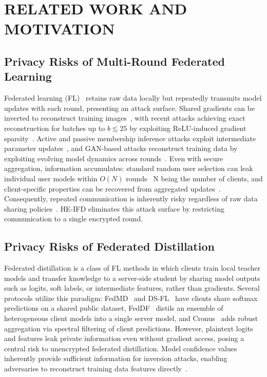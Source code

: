 \section{RELATED WORK AND MOTIVATION}
\label{sec:background}



\subsection{Privacy Risks of Multi-Round Federated Learning}
\label{sec:bg_multiround}

Federated learning (FL)~\cite{mcmahan2017communication} retains raw data locally but repeatedly transmits model updates with each round, presenting an attack surface. Shared gradients can be inverted to reconstruct training images~\cite{zhu2019deep}, with recent attacks achieving exact reconstruction for batches up to $b \lesssim 25$ by exploiting ReLU-induced gradient sparsity~\cite{dimitrov2024spear}. Active and passive membership inference attacks exploit intermediate parameter updates~\cite{nasr2019comprehensive}, and GAN-based attacks reconstruct training data by exploiting evolving model dynamics across rounds~\cite{hitaj2017deep}. Even with secure aggregation, information accumulates: standard random user selection can leak individual user models within $O(N)$ rounds~\cite{so2023securing} N being the number of clients, and client-specific properties can be recovered from aggregated updates~\cite{kerkouche2023property}. Consequently, repeated communication is inherently risky regardless of raw data sharing policies~\cite{carletti2025sok}. HE-IFD eliminates this attack surface by restricting communication to a single encrypted round.


\subsection{Privacy Risks of Federated Distillation}
\label{sec:bg_server_inference}

Federated distillation is a class of FL methods in which clients train local teacher models and transfer knowledge to a server-side student by sharing model outputs such as
logits, soft labels, or intermediate features, rather than gradients. Several protocols utilize this paradigm: FedMD~\cite{li2019fedmd} and DS-FL~\cite{itahara2021dsfl} have clients share softmax predictions on a shared public dataset, FedDF~\cite{lin2020feddf} distils an ensemble of heterogeneous client models into a single server model, and Cronus~\cite{chang2019cronus} adds robust aggregation via spectral filtering of client predictions. However, plaintext logits and features leak private information even without gradient access, posing a central risk to unencrypted federated distillation. Model confidence values inherently provide sufficient information for inversion attacks, enabling adversaries to reconstruct training data features directly~\cite{fredrikson2015model}.

